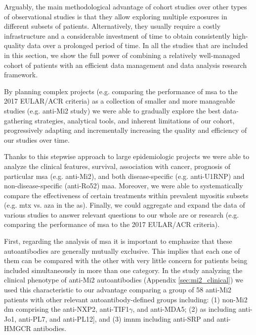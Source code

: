 Arguably, the main methodological advantage of cohort studies over other types of observational studies is that they allow exploring multiple exposures in different subsets of patients. Alternatively, they usually require a costly infrastructure and a considerable investment of time to obtain consistently high-quality data over a prolonged period of time. In all the studies that are included in this section, we show the full power of combining a relatively well-managed cohort of patients with an efficient data management and data analysis research framework.

By planning complex projects (e.g. comparing the performance of \gls{msa} to the 2017 EULAR/ACR criteria) as a collection of smaller and more manageable studies (e.g. anti-Mi2 study) we were able to gradually explore the best data-gathering strategies, analytical tools, and inherent limitations of our cohort, progressively adapting and incrementally increasing the quality and efficiency of our studies over time.

Thanks to this stepwise approach to large epidemiologic projects we were able to analyze the clinical features, survival, association with cancer, prognosis of particular \gls{msa} (e.g. anti-Mi2), and both disease-specific (e.g. anti-U1RNP) and non-disease-specific (anti-Ro52) \gls{maa}. Moreover, we were able to systematically compare the effectiveness of certain treatments within prevalent myositis subsets (e.g. \gls{mtx} vs. \gls{aza} in the \gls{as}). Finally, we could aggregate and expand the data of various studies to answer relevant questions to our whole are or research (e.g. comparing the performance of \gls{msa} to the 2017 EULAR/ACR criteria).

First, regarding the analysis of \gls{msa} it is important to emphasize that these autoantibodies are generally mutually exclusive. This implies that each one of them can be compared with the other with very little concern for patients being included simultaneously in more than one category. In the study analyzing the clinical phenotype of anti-Mi2 autoantibodies (Appendix \autoref{sec:mi2_clinical}) we used this characteristic to our advantage comparing a group of 58 anti-Mi2 patients with other relevant autoantibody-defined groups including: (1) non-Mi2 \gls{dm} comprising the anti-NXP2, anti-TIF1$\gamma$, and anti-MDA5; (2) \gls{as} including anti-Jo1, anti-PL7, and anti-PL12], and (3) \gls{imnm} including anti-SRP and anti-HMGCR antibodies.

